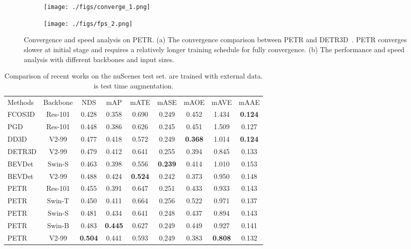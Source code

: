 \documentclass[runningheads]{llncs}
\begin{document}
\begin{figure*}[t]
	\centering  
	\begin{subfigure}{.49\textwidth}
			\centering
			\texttt{[image: ./figs/converge\_1.png]}
			\caption{}
		\end{subfigure}
	\begin{subfigure}{.49\textwidth}
			\centering
			\texttt{[image: ./figs/fps\_2.png]}
			\caption{}
		\end{subfigure}
	\caption{Convergence and speed analysis on PETR. (a) The convergence comparison between PETR and DETR3D~\cite{wang2022detr3d}. PETR converges slower at initial stage and requires a relatively longer training schedule for fully convergence. (b) The performance and speed analysis with different backbones and input sizes. }
	\label{analysis}
\end{figure*}
\begin{table}[t!]
\begin{center}
\caption{Comparison of recent works on the nuScenes test set.  are trained with external data.   is test time augmentation. }
\label{table:2}
\begin{tabular}{l|c|ccccccc}
\hline\noalign{\smallskip}
Methods & Backbone & NDS & mAP & mATE & mASE & mAOE & mAVE & mAAE \\

\noalign{\smallskip}
\hline
\noalign{\smallskip}
FCOS3D & Res-101 &0.428 &0.358 &0.690 &0.249 &0.452 &1.434 &\textbf{0.124}  \\
 PGD & Res-101 &0.448 &0.386 &0.626 &0.245 &0.451 &1.509 &0.127  \\
 DD3D & V2-99 &0.477 &0.418  &0.572 &0.249 &\textbf{0.368} &1.014 &\textbf{0.124}  \\
 DETR3D & V2-99 &0.479 &0.412  &0.641 &0.255 &0.394 &0.845 &0.133  \\
 BEVDet & Swin-S &0.463 &0.398 &0.556 &\textbf{0.239} &0.414 &1.010 &0.153  \\
 BEVDet & V2-99 &0.488 &0.424 &\textbf{0.524} &0.242 &0.373 &0.950 &0.148  \\
\hline
PETR & Res-101 &0.455 &0.391 &0.647 &0.251 &0.433 &0.933 &0.143 \\
PETR & Swin-T &0.450 &0.411 &0.664 &0.256 &0.522 &0.971 &0.137\\
PETR & Swin-S &0.481 &0.434 &0.641 &0.248 &0.437 &0.894 &0.143\\
PETR & Swin-B &0.483 &\textbf{0.445} &0.627 &0.249 &0.449 &0.927 &0.141\\					
PETR & V2-99 &\textbf{0.504} &0.441 &0.593 &0.249 &0.383 &\textbf{0.808} &0.132  \\
\hline
\end{tabular}
\end{center}
\end{table}
\end{document}
